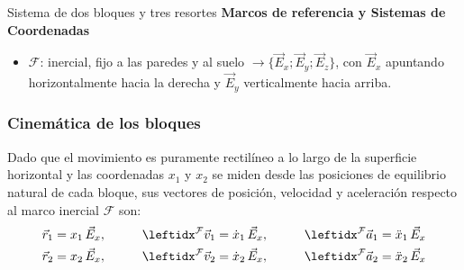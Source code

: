 \begin{solucion}{Sistema de dos bloques y tres resortes}
\textbf{Marcos de referencia y Sistemas de Coordenadas}
\begin{itemize}
    \item $\mathcal{F}$: inercial, fijo a las paredes y al suelo $\longrightarrow\{\vec{E}_x;\vec{E}_y;\vec{E}_z\}$, con $\vec{E}_x$ apuntando horizontalmente hacia la derecha y $\vec{E}_y$ verticalmente hacia arriba.
\end{itemize}

\subsubsection*{Cinemática de los bloques}
Dado que el movimiento es puramente rectilíneo a lo largo de la superficie horizontal y las coordenadas $x_1$ y $x_2$ se miden desde las posiciones de equilibrio natural de cada bloque, sus vectores de posición, velocidad y aceleración respecto al marco inercial $\mathcal{F}$ son:
$$\begin{aligned}
    \vec{r}_1 &= x_1\,\vec{E}_x, &\qquad \marc{\vec{v}_1}{F}{} &= \dot{x}_1\,\vec{E}_x, &\qquad \marc{\vec{a}_1}{F}{} &= \ddot{x}_1\,\vec{E}_x \\
    \vec{r}_2 &= x_2\,\vec{E}_x, &\qquad \marc{\vec{v}_2}{F}{} &= \dot{x}_2\,\vec{E}_x, &\qquad \marc{\vec{a}_2}{F}{} &= \ddot{x}_2\,\vec{E}_x
\end{aligned}$$


\end{solucion}
